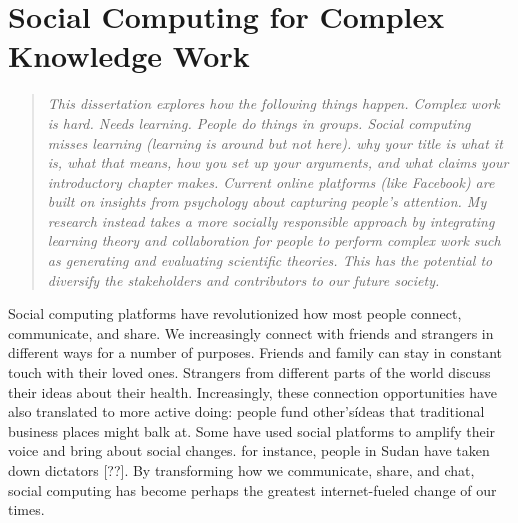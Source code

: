 \chapter{Social Computing for Complex Knowledge Work}

\begin{quote}
\emph{This dissertation explores how the following things happen. Complex work is hard. Needs learning. People do things in groups. Social computing misses learning (learning is around but not here). why your title is what it is, what that means, how you set up your arguments, and what claims your introductory chapter makes. Current online platforms (like Facebook) are built on insights from psychology about capturing people’s attention. My research instead takes a more socially responsible approach by integrating learning theory and collaboration for people to perform complex work such as generating and evaluating scientific theories. This has the potential to diversify the stakeholders and contributors to our future society.}
\end{quote}
\vspace{0.25in}

Social computing platforms have revolutionized how most people connect, communicate, and share. We increasingly connect with friends and strangers in different ways for a number of purposes. Friends and family can stay in constant touch with their loved ones. Strangers from different parts of the world discuss their ideas about their health. Increasingly, these connection opportunities have also translated to more active doing: people fund other's\'  ideas that traditional business places might balk at. Some have used social platforms to amplify their voice and bring about social changes. for instance, people in Sudan have taken down dictators [??]. By transforming how we communicate, share, and chat, social computing has become perhaps the greatest internet-fueled change of our times. 


